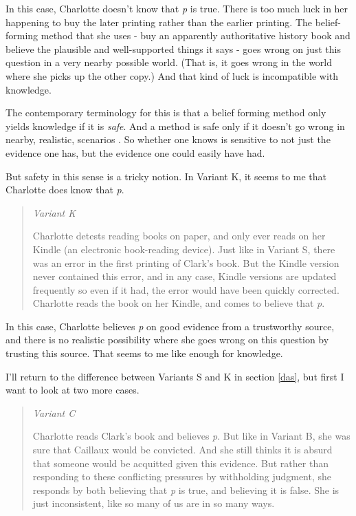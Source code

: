\documentclass[
  11pt,
]{book}
\begin{document}
In this case, Charlotte doesn't know that \emph{p} is true. There is too much luck in her happening to buy the later printing rather than the earlier printing. The belief-forming method that she uses - buy an apparently authoritative history book and believe the plausible and well-supported things it says - goes wrong on just this question in a very nearby possible world. (That is, it goes wrong in the world where she picks up the other copy.) And that kind of luck is incompatible with knowledge.

The contemporary terminology for this is that a belief forming method only yields knowledge if it is \emph{safe}. And a method is safe only if it doesn't go wrong in nearby, realistic, scenarios \citep{Williamson2000}. So whether one knows is sensitive to not just the evidence one has, but the evidence one could easily have had.

But safety in this sense is a tricky notion. In Variant K, it seems to me that Charlotte does know that \emph{p}.

\begin{quote}
\emph{Variant K}

Charlotte detests reading books on paper, and only ever reads on her Kindle (an electronic book-reading device). Just like in Variant S, there was an error in the first printing of Clark's book. But the Kindle version never contained this error, and in any case, Kindle versions are updated frequently so even if it had, the error would have been quickly corrected. Charlotte reads the book on her Kindle, and comes to believe that \emph{p}.
\end{quote}

In this case, Charlotte believes \emph{p} on good evidence from a trustworthy source, and there is no realistic possibility where she goes wrong on this question by trusting this source. That seems to me like enough for knowledge.

I'll return to the difference between Variants S and K in section \ref{das}, but first I want to look at two more cases.

\begin{quote}
\emph{Variant C}

Charlotte reads Clark's book and believes \emph{p}. But like in Variant B, she was sure that Caillaux would be convicted. And she still thinks it is absurd that someone would be acquitted given this evidence. But rather than responding to these conflicting pressures by withholding judgment, she responds by both believing that \emph{p} is true, and believing it is false. She is just inconsistent, like so many of us are in so many ways.
\end{quote}
\end{document}
